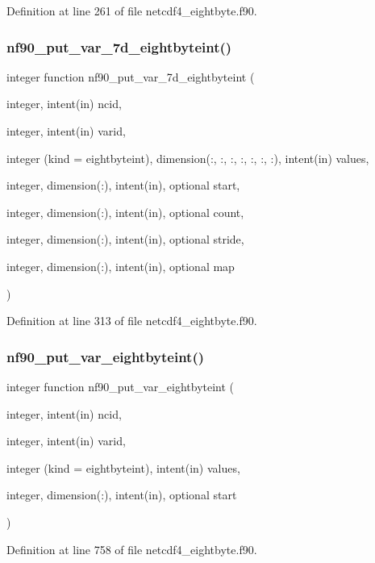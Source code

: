Definition at line 261 of file netcdf4\+\_\+eightbyte.\+f90.

\mbox{\label{netcdf4__eightbyte_8f90_a51868f926ef0b973025994cd6c505ceb}} 
\subsubsection{\texorpdfstring{nf90\+\_\+put\+\_\+var\+\_\+7d\+\_\+eightbyteint()}{nf90\_put\_var\_7d\_eightbyteint()}}
{\footnotesize\ttfamily integer function nf90\+\_\+put\+\_\+var\+\_\+7d\+\_\+eightbyteint (\begin{DoxyParamCaption}\item[{integer, intent(in)}]{ncid,  }\item[{integer, intent(in)}]{varid,  }\item[{integer (kind = eightbyteint), dimension(\+:, \+:, \+:, \+:, \+:, \+:, \+:), intent(in)}]{values,  }\item[{integer, dimension(\+:), intent(in), optional}]{start,  }\item[{integer, dimension(\+:), intent(in), optional}]{count,  }\item[{integer, dimension(\+:), intent(in), optional}]{stride,  }\item[{integer, dimension(\+:), intent(in), optional}]{map }\end{DoxyParamCaption})}



Definition at line 313 of file netcdf4\+\_\+eightbyte.\+f90.

\mbox{\label{netcdf4__eightbyte_8f90_a19465ca23067ad30103744429fb4bb95}} 
\subsubsection{\texorpdfstring{nf90\+\_\+put\+\_\+var\+\_\+eightbyteint()}{nf90\_put\_var\_eightbyteint()}}
{\footnotesize\ttfamily integer function nf90\+\_\+put\+\_\+var\+\_\+eightbyteint (\begin{DoxyParamCaption}\item[{integer, intent(in)}]{ncid,  }\item[{integer, intent(in)}]{varid,  }\item[{integer (kind = eightbyteint), intent(in)}]{values,  }\item[{integer, dimension(\+:), intent(in), optional}]{start }\end{DoxyParamCaption})}



Definition at line 758 of file netcdf4\+\_\+eightbyte.\+f90.


